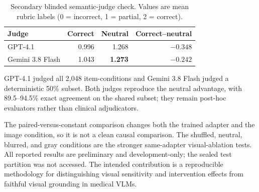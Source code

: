 \documentclass[letterpaper]{article}
\begin{document}
\begin{table}[t]
\centering
\small
\caption{Secondary blinded semantic-judge check. Values are mean rubric labels (0 = incorrect, 1 = partial, 2 = correct).}
\label{tab:llm-judges}
\begin{tabular}{lrrr}
\toprule
\textbf{Judge} & \textbf{Correct} & \textbf{Neutral} & \textbf{Correct--neutral} \\
\midrule
GPT-4.1 & 0.996 & 1.268 & $-0.348$ \\
Gemini 3.8 Flash & 1.043 & \textbf{1.273} & $-0.242$ \\
\bottomrule
\end{tabular}
\end{table}

GPT-4.1 judged all 2,048 item-conditions and Gemini 3.8 Flash judged a deterministic 50\% subset. Both judges reproduce the neutral advantage, with 89.5--94.5\% exact agreement on the shared subset; they remain post-hoc evaluators rather than clinical adjudicators.

The paired-versus-constant comparison changes both the trained adapter and the image condition, so it is not a clean causal comparison. The shuffled, neutral, blurred, and gray conditions are the stronger same-adapter visual-ablation tests. All reported results are preliminary and development-only; the sealed test partition was not accessed. The intended contribution is a reproducible methodology for distinguishing visual sensitivity and intervention effects from faithful visual grounding in medical VLMs.


\end{document}
